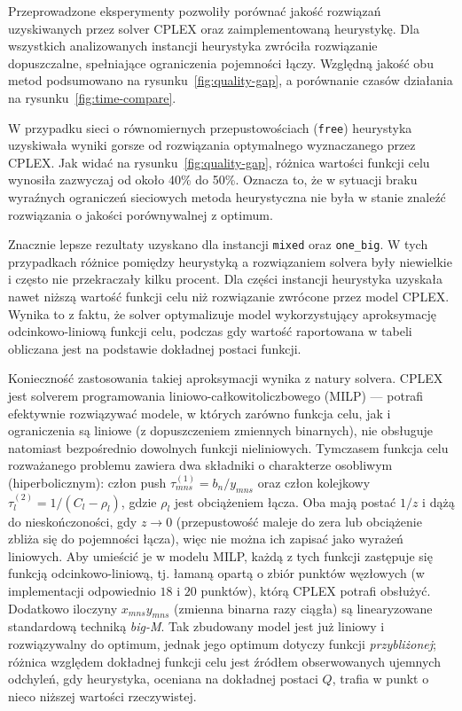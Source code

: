 \documentclass{article}
\begin{document}
Przeprowadzone eksperymenty pozwoliły porównać jakość rozwiązań uzyskiwanych przez solver CPLEX oraz zaimplementowaną heurystykę. Dla wszystkich analizowanych instancji heurystyka zwróciła rozwiązanie dopuszczalne, spełniające ograniczenia pojemności łączy. Względną jakość obu metod podsumowano na rysunku~\ref{fig:quality-gap}, a porównanie czasów działania na rysunku~\ref{fig:time-compare}.

W przypadku sieci o równomiernych przepustowościach (\texttt{free}) heurystyka uzyskiwała wyniki gorsze od rozwiązania optymalnego wyznaczanego przez CPLEX. Jak widać na rysunku~\ref{fig:quality-gap}, różnica wartości funkcji celu wynosiła zazwyczaj od około 40\% do 50\%. Oznacza to, że w sytuacji braku wyraźnych ograniczeń sieciowych metoda heurystyczna nie była w stanie znaleźć rozwiązania o jakości porównywalnej z optimum.

Znacznie lepsze rezultaty uzyskano dla instancji \texttt{mixed} oraz \texttt{one\_big}. W tych przypadkach różnice pomiędzy heurystyką a rozwiązaniem solvera były niewielkie i często nie przekraczały kilku procent. Dla części instancji heurystyka uzyskała nawet niższą wartość funkcji celu niż rozwiązanie zwrócone przez model CPLEX. Wynika to z faktu, że solver optymalizuje model wykorzystujący aproksymację odcinkowo-liniową funkcji celu, podczas gdy wartość raportowana w tabeli obliczana jest na podstawie dokładnej postaci funkcji.

Konieczność zastosowania takiej aproksymacji wynika z natury solvera. CPLEX jest solverem programowania liniowo-całkowitoliczbowego (MILP) — potrafi efektywnie rozwiązywać modele, w których zarówno funkcja celu, jak i ograniczenia są liniowe (z dopuszczeniem zmiennych binarnych), nie obsługuje natomiast bezpośrednio dowolnych funkcji nieliniowych. Tymczasem funkcja celu rozważanego problemu zawiera dwa składniki o charakterze osobliwym (hiperbolicznym): człon push $\tau^{(1)}_{mns} = b_n/y_{mns}$ oraz człon kolejkowy $\tau^{(2)}_l = 1/(C_l - \rho_l)$, gdzie $\rho_l$ jest obciążeniem łącza. Oba mają postać $1/z$ i dążą do nieskończoności, gdy $z\to 0$ (przepustowość maleje do zera lub obciążenie zbliża się do pojemności łącza), więc nie można ich zapisać jako wyrażeń liniowych. Aby umieścić je w modelu MILP, każdą z tych funkcji zastępuje się funkcją odcinkowo-liniową, tj. łamaną opartą o zbiór punktów węzłowych (w implementacji odpowiednio $18$ i $20$ punktów), którą CPLEX potrafi obsłużyć. Dodatkowo iloczyny $x_{mns}y_{mns}$ (zmienna binarna razy ciągła) są linearyzowane standardową techniką \emph{big-M}. Tak zbudowany model jest już liniowy i rozwiązywalny do optimum, jednak jego optimum dotyczy funkcji \emph{przybliżonej}; różnica względem dokładnej funkcji celu jest źródłem obserwowanych ujemnych odchyleń, gdy heurystyka, oceniana na dokładnej postaci $Q$, trafia w punkt o nieco niższej wartości rzeczywistej.
\end{document}
